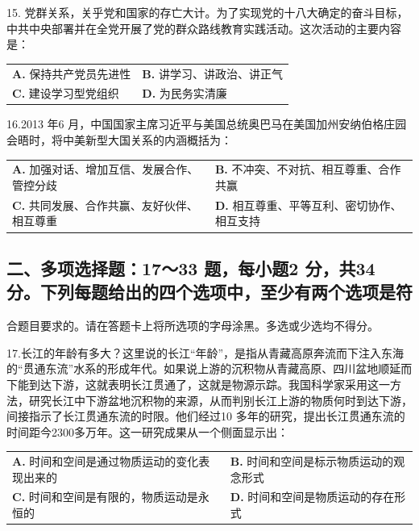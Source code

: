 \documentclass[UTF8,11pt]{ctexart}
\begin{document}
15. 党群关系，关乎党和国家的存亡大计。为了实现党的十八大确定的奋斗目标，中共中央部署并在全党开展了党的群众路线教育实践活动。这次活动的主要内容是：


\begin{center}\begin{tabular}{>{\raggedright\arraybackslash}p{\dimexpr(\linewidth-4\tabcolsep)/2\relax}>{\raggedright\arraybackslash}p{\dimexpr(\linewidth-4\tabcolsep)/2\relax}}
\textbf{A.} 保持共产党员先进性 & \textbf{B.} 讲学习、讲政治、讲正气\\[.35em]
\textbf{C.} 建设学习型党组织 & \textbf{D.} 为民务实清廉\\[.35em]\end{tabular}\end{center}

16.2013 年6 月，中国国家主席习近平与美国总统奥巴马在美国加州安纳伯格庄园会晤时，将中美新型大国关系的内涵概括为：


\begin{center}\begin{tabular}{>{\raggedright\arraybackslash}p{\dimexpr(\linewidth-4\tabcolsep)/2\relax}>{\raggedright\arraybackslash}p{\dimexpr(\linewidth-4\tabcolsep)/2\relax}}
\textbf{A.} 加强对话、增加互信、发展合作、管控分歧 & \textbf{B.} 不冲突、不对抗、相互尊重、合作共赢\\[.35em]
\textbf{C.} 共同发展、合作共赢、友好伙伴、相互尊重 & \textbf{D.} 相互尊重、平等互利、密切协作、相互支持\\[.35em]\end{tabular}\end{center}

\subsection*{二、多项选择题：17～33 题，每小题2 分，共34 分。下列每题给出的四个选项中，至少有两个选项是符}

合题目要求的。请在答题卡上将所选项的字母涂黑。多选或少选均不得分。


17.长江的年龄有多大？这里说的长江“年龄”，是指从青藏高原奔流而下注入东海的“贯通东流”水系的形成年代。如果说上游的沉积物从青藏高原、四川盆地顺延而下能到达下游，这就表明长江贯通了，这就是物源示踪。我国科学家采用这一方法，研究长江中下游盆地沉积物的来源，从而判别长江上游的物质何时到达下游，间接指示了长江贯通东流的时限。他们经过10 多年的研究，提出长江贯通东流的时间距今2300多万年。这一研究成果从一个侧面显示出：


\begin{center}\begin{tabular}{>{\raggedright\arraybackslash}p{\dimexpr(\linewidth-4\tabcolsep)/2\relax}>{\raggedright\arraybackslash}p{\dimexpr(\linewidth-4\tabcolsep)/2\relax}}
\textbf{A.} 时间和空间是通过物质运动的变化表现出来的 & \textbf{B.} 时间和空间是标示物质运动的观念形式\\[.35em]
\textbf{C.} 时间和空间是有限的，物质运动是永恒的 & \textbf{D.} 时间和空间是物质运动的存在形式\\[.35em]\end{tabular}\end{center}
\end{document}
